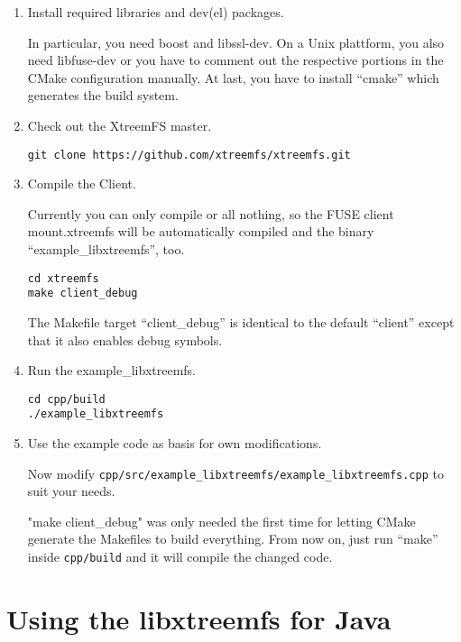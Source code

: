 \documentclass[a4paper,10pt]{book}
\begin{document}
\begin{enumerate}
 \item Install required libraries and dev(el) packages.

In particular, you need boost and libssl-dev. On a Unix plattform, you also need libfuse-dev or you have to comment out the respective portions in the CMake configuration manually. At last, you have to install ``cmake'' which generates the build system.

  \item Check out the XtreemFS master.

\begin{verbatim}
git clone https://github.com/xtreemfs/xtreemfs.git
\end{verbatim}

  \item Compile the Client.

Currently you can only compile or all nothing, so the FUSE client mount.xtreemfs will be automatically compiled and the binary ``example\_libxtreemfs'', too.

\begin{verbatim}
cd xtreemfs
make client_debug
\end{verbatim}

The Makefile target ``client\_debug'' is identical to the default ``client'' except that it also enables debug symbols.

  \item Run the example\_libxtreemfs.

\begin{verbatim}
cd cpp/build
./example_libxtreemfs
\end{verbatim}

\item Use the example code as basis for own modifications.

Now modify \texttt{cpp/src/example\_libxtreemfs/example\_libxtreemfs.cpp} to suit your needs.

"make client\_debug" was only needed the first time for letting CMake generate the Makefiles to build everything. From now on, just run ``make'' inside \texttt{cpp/build} and it will compile the changed code.

\end{enumerate}

\section{Using the libxtreemfs for Java}
\label{sec:libxtreemfs_for_java}
\end{document}
